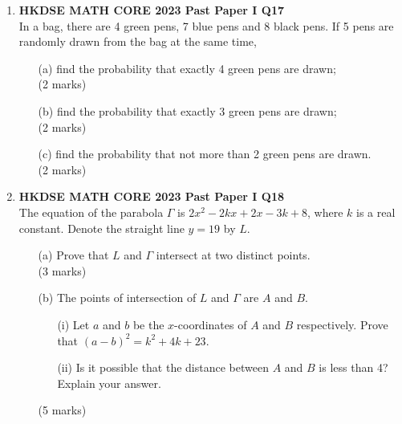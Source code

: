 \documentclass[12pt]{article}
\begin{document}
\begin{enumerate}
	\item \textbf{HKDSE MATH CORE 2023 Past Paper I Q17}\\
	In a bag, there are 4 green pens, 7 blue pens and 8 black pens. If 5 pens are randomly drawn from the bag at the same time,
	\begin{enumerate}
		\item[(a)] find the probability that exactly 4 green pens are drawn; \\(2 marks)
		\item[(b)] find the probability that exactly 3 green pens are drawn; \\(2 marks)
		\item[(c)] find the probability that not more than 2 green pens are drawn. \\(2 marks)
	\end{enumerate}

	\item \textbf{HKDSE MATH CORE 2023 Past Paper I Q18}\\
	The equation of the parabola $\Gamma$ is $2x^2 - 2kx + 2x - 3k + 8$, where $k$ is a real constant. Denote the straight line $y = 19$ by $L$.
	\begin{enumerate}
		\item[(a)] Prove that $L$ and $\Gamma$ intersect at two distinct points. \\(3 marks)
		\item[(b)] The points of intersection of $L$ and $\Gamma$ are $A$ and $B$.
		\begin{enumerate}
			\item[(i)] Let $a$ and $b$ be the $x$-coordinates of $A$ and $B$ respectively. Prove that $(a - b)^2 = k^2 + 4k + 23$.
			\item[(ii)] Is it possible that the distance between $A$ and $B$ is less than 4? Explain your answer.
		\end{enumerate}
		(5 marks)
	\end{enumerate}


\end{enumerate}
\end{document}
